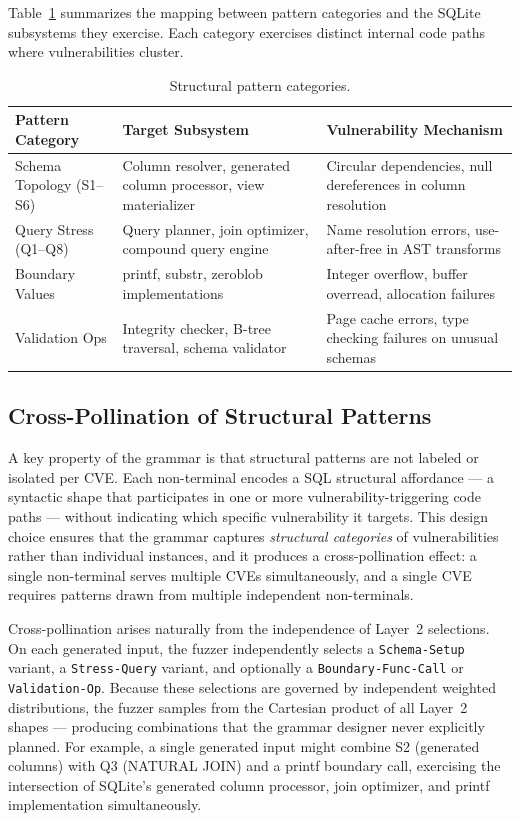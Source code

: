 Table~\ref{tab:pattern-subsystem} summarizes the mapping between pattern categories and the SQLite subsystems they exercise. Each category exercises distinct internal code paths where vulnerabilities cluster.

\begin{table}[htbp]
\caption{Structural pattern categories.}
\label{tab:pattern-subsystem}
\centering
\small
\begin{tabular}{>{\raggedright\arraybackslash}p{3.2cm} >{\raggedright\arraybackslash}p{4.0cm} >{\raggedright\arraybackslash}p{5.5cm}}
\toprule
\textbf{Pattern Category} & \textbf{Target Subsystem} & \textbf{Vulnerability Mechanism} \\
\midrule
Schema Topology (S1--S6) & Column resolver, generated column processor, view materializer & Circular dependencies, null dereferences in column resolution \\
Query Stress (Q1--Q8) & Query planner, join optimizer, compound query engine & Name resolution errors, use-after-free in AST transforms \\
Boundary Values & printf, substr, zeroblob implementations & Integer overflow, buffer overread, allocation failures \\
Validation Ops & Integrity checker, B-tree traversal, schema validator & Page cache errors, type checking failures on unusual schemas \\
\bottomrule
\end{tabular}
\end{table}

\subsection{Cross-Pollination of Structural Patterns}
\label{sec:cross-pollination}

A key property of the grammar is that structural patterns are not labeled or isolated per CVE. Each non-terminal encodes a SQL structural affordance --- a syntactic shape that participates in one or more vulnerability-triggering code paths --- without indicating which specific vulnerability it targets. This design choice ensures that the grammar captures \emph{structural categories} of vulnerabilities rather than individual instances, and it produces a cross-pollination effect: a single non-terminal serves multiple CVEs simultaneously, and a single CVE requires patterns drawn from multiple independent non-terminals.

Cross-pollination arises naturally from the independence of Layer~2 selections. On each generated input, the fuzzer independently selects a \texttt{Schema-Setup} variant, a \texttt{Stress-Query} variant, and optionally a \texttt{Boundary-Func-Call} or \texttt{Validation-Op}. Because these selections are governed by independent weighted distributions, the fuzzer samples from the Cartesian product of all Layer~2 shapes --- producing combinations that the grammar designer never explicitly planned. For example, a single generated input might combine S2 (generated columns) with Q3 (NATURAL JOIN) and a printf boundary call, exercising the intersection of SQLite's generated column processor, join optimizer, and printf implementation simultaneously.

